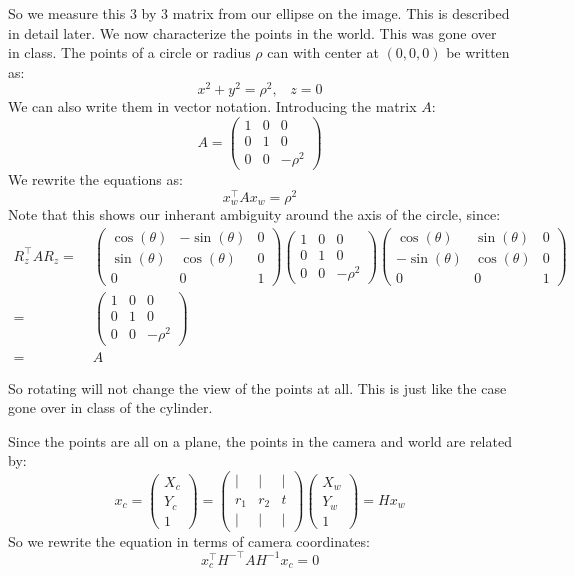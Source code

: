\documentclass[11pt,english]{article}
\begin{document}
\begin{enumerate}
So we measure this 3 by 3 matrix from our ellipse on the image. This is described in detail later.
We now characterize the points in the world. This was gone over in class.
The points of a circle or radius $\rho$ can with center at $(0,0,0)$ be written as:
\[ x^2 + y^2 = \rho^2,\;\;\; z = 0 \]
We can also write them in vector notation. Introducing the matrix $A$:
\[ A = \begin{pmatrix} 1 & 0 & 0 \\ 0 & 1 & 0  \\ 0 & 0 & -\rho^2 \end{pmatrix} \]
We rewrite the equations as:
\[ x_w^\top A x_w = \rho^2 \]
Note that this shows our inherant ambiguity around the axis of the circle, since:
\begin{align*}
R_z^\top AR_z
=&\; \begin{pmatrix}
	\cos(\theta) & -\sin(\theta) & 0 \\
	\sin(\theta) & \cos(\theta) & 0  \\
	0 & 0 & 1
\end{pmatrix} \begin{pmatrix}
	1 & 0 & 0 \\
	0 & 1 & 0 \\
	0 & 0 & -\rho^2
\end{pmatrix} \begin{pmatrix}
	\cos(\theta) & \sin(\theta) & 0 \\
	-\sin(\theta) & \cos(\theta) & 0  \\
	0 & 0 & 1
\end{pmatrix} \\
=&\; \begin{pmatrix}
	1 & 0 & 0 \\
	0 & 1 & 0 \\
	0 & 0 & -\rho^2
\end{pmatrix} \\
=&\; A
\end{align*}

So rotating will not change the view of the points at all. This is just like the case gone over in class of the 
cylinder.

Since the points are all on a plane, the points in the camera and world are related by:
\begin{equation*}
x_c = \begin{pmatrix} X_c \\ Y_c \\ 1 \end{pmatrix} = 
\begin{pmatrix} | & | & | \\ r_1 & r_2 & t \\ | & | & | \end{pmatrix}
\begin{pmatrix} X_w \\ Y_w \\ 1 \end{pmatrix} =
H x_w
\end{equation*}
So we rewrite the equation in terms of camera coordinates:
\[ x_c^\top H^{-\top} A H^{-1} x_c = 0  \]


\end{enumerate}
\end{document}
